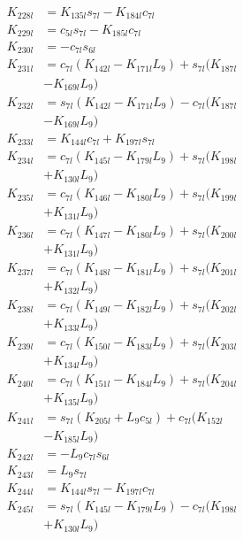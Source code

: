 \begin{multicols}{2}
\begin{align}
K_{228l} &= K_{135l}s_{7l} - K_{184l}c_{7l} \nonumber \\
K_{229l} &= c_{5l}s_{7l} - K_{185l}c_{7l} \nonumber \\
K_{230l} &= -c_{7l}s_{6l} \nonumber \\
K_{231l} &= c_{7l}(K_{142l} - K_{171l}L_9) + s_{7l}(K_{187l}  \nonumber \\
&- K_{169l}L_9) \nonumber \\
K_{232l} &= s_{7l}(K_{142l} - K_{171l}L_9) - c_{7l}(K_{187l}  \nonumber \\
&- K_{169l}L_9) \nonumber \\
K_{233l} &= K_{144l}c_{7l} + K_{197l}s_{7l} \nonumber \\
K_{234l} &= c_{7l}(K_{145l} - K_{179l}L_9) + s_{7l}(K_{198l}  \nonumber \\
&+ K_{130l}L_9) \nonumber \\
K_{235l} &= c_{7l}(K_{146l} - K_{180l}L_9) + s_{7l}(K_{199l}  \nonumber \\
&+ K_{131l}L_9) \nonumber \\
K_{236l} &= c_{7l}(K_{147l} - K_{180l}L_9) + s_{7l}(K_{200l}  \nonumber \\
&+ K_{131l}L_9) \nonumber \\
K_{237l} &= c_{7l}(K_{148l} - K_{181l}L_9) + s_{7l}(K_{201l}  \nonumber \\
&+ K_{132l}L_9) \nonumber \\
K_{238l} &= c_{7l}(K_{149l} - K_{182l}L_9) + s_{7l}(K_{202l}  \nonumber \\
&+ K_{133l}L_9) \nonumber \\
K_{239l} &= c_{7l}(K_{150l} - K_{183l}L_9) + s_{7l}(K_{203l}  \nonumber \\
&+ K_{134l}L_9) \nonumber \\
K_{240l} &= c_{7l}(K_{151l} - K_{184l}L_9) + s_{7l}(K_{204l}  \nonumber \\
&+ K_{135l}L_9) \nonumber \\
K_{241l} &= s_{7l}(K_{205l} + L_9c_{5l}) + c_{7l}(K_{152l}  \nonumber \\
&- K_{185l}L_9) \nonumber \\
K_{242l} &= -L_9c_{7l}s_{6l} \nonumber \\
K_{243l} &= L_9s_{7l} \nonumber \\
K_{244l} &= K_{144l}s_{7l} - K_{197l}c_{7l} \nonumber \\
K_{245l} &= s_{7l}(K_{145l} - K_{179l}L_9) - c_{7l}(K_{198l}  \nonumber \\
&+ K_{130l}L_9) \nonumber \\

\end{align}
\end{multicols}

